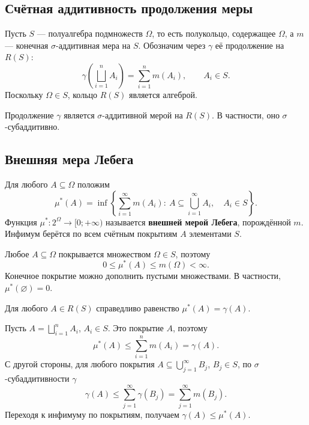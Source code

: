 \clearpage
\begingroup
{}
\everymath{\textstyle}
\subsection{Счётная аддитивность продолжения меры}

Пусть $S$ --- полуалгебра подмножеств $\Omega$, то есть полукольцо,
содержащее $\Omega$, а $m$ --- конечная $\sigma$-аддитивная мера на $S$.
Обозначим через $\gamma$ её продолжение на $R(S)$:
\[
    \gamma\left(\bigsqcup_{i=1}^{n}A_i\right)
    =\sum_{i=1}^{n}m(A_i),\qquad A_i\in S.
\]
Поскольку $\Omega\in S$, кольцо $R(S)$ является алгеброй.

\begin{theorem}
    Продолжение $\gamma$ является $\sigma$-аддитивной мерой на $R(S)$.
    В частности, оно $\sigma$-субаддитивно.
\end{theorem}

\subsection{Внешняя мера Лебега}

\begin{definition}
    Для любого $A\subseteq\Omega$ положим
    \[
        \mu^*(A)=\inf\left\{
            \sum_{i=1}^{\infty}m(A_i):\
            A\subseteq\bigcup_{i=1}^{\infty}A_i,\quad A_i\in S
        \right\}.
    \]
    Функция $\mu^*\colon2^\Omega\to[0;+\infty)$ называется
    \textbf{внешней мерой Лебега}, порождённой $m$.
    Инфимум берётся по всем счётным покрытиям $A$ элементами $S$.
\end{definition}

\begin{remark}
    Любое $A\subseteq\Omega$ покрывается множеством $\Omega\in S$, поэтому
    \[
        0\leq\mu^*(A)\leq m(\Omega)<\infty.
    \]
    Конечное покрытие можно дополнить пустыми множествами.
    В частности, $\mu^*(\varnothing)=0$.
\end{remark}

\begin{theorem}
    Для любого $A\in R(S)$ справедливо равенство $\mu^*(A)=\gamma(A)$.
\end{theorem}

\begin{Proof}
    Пусть $A=\bigsqcup_{i=1}^{n}A_i$, $A_i\in S$.
    Это покрытие $A$, поэтому
    \[
        \mu^*(A)\leq\sum_{i=1}^{n}m(A_i)=\gamma(A).
    \]
    С другой стороны, для любого покрытия $A\subseteq\bigcup_{j=1}^{\infty}B_j$,
    $B_j\in S$, по $\sigma$-субаддитивности $\gamma$
    \[
        \gamma(A)\leq\sum_{j=1}^{\infty}\gamma(B_j)
        =\sum_{j=1}^{\infty}m(B_j).
    \]
    Переходя к инфимуму по покрытиям, получаем $\gamma(A)\leq\mu^*(A)$.
\end{Proof}

